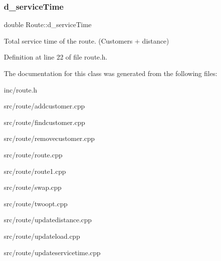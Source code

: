 \subsubsection{\texorpdfstring{d\+\_\+service\+Time}{d\_serviceTime}}
{\footnotesize\ttfamily double Route\+::d\+\_\+service\+Time\hspace{0.3cm}{\ttfamily [private]}}

Total service time of the route. (Customers + distance) 

Definition at line 22 of file route.\+h.



The documentation for this class was generated from the following files\+:\begin{DoxyCompactItemize}
\item 
inc/route.\+h\item 
src/route/addcustomer.\+cpp\item 
src/route/findcustomer.\+cpp\item 
src/route/removecustomer.\+cpp\item 
src/route/route.\+cpp\item 
src/route/route1.\+cpp\item 
src/route/swap.\+cpp\item 
src/route/twoopt.\+cpp\item 
src/route/updatedistance.\+cpp\item 
src/route/updateload.\+cpp\item 
src/route/updateservicetime.\+cpp\end{DoxyCompactItemize}
